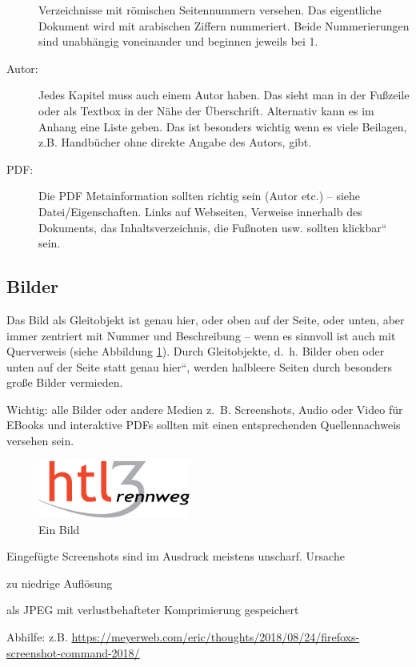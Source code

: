 \begin{description}
Verzeichnisse mit römischen Seitennummern versehen. Das eigentliche
Dokument wird mit arabischen Ziffern nummeriert. Beide Nummerierungen
sind unabhängig voneinander und beginnen jeweils bei 1.
\item [{Autor:}] Jedes Kapitel muss auch einem Autor haben. Das sieht man
in der Fußzeile oder als Textbox in der Nähe der Überschrift. Alternativ
kann es im Anhang eine Liste geben. Das ist besonders wichtig wenn
es viele Beilagen, z.B. Handbücher ohne direkte Angabe des Autors,
gibt.
\item [{PDF:}] Die PDF Metainformation sollten richtig sein (Autor etc.)
-- siehe Datei/Eigenschaften. Links auf Webseiten, Verweise innerhalb
des Dokuments, das Inhaltsverzeichnis, die Fußnoten usw. sollten \quotedblbase klickbar``
sein.
\end{description}

\subsection{Bilder\label{sub:Bilder}}

Das Bild als Gleitobjekt ist genau hier, oder oben auf der Seite,
oder unten, aber immer zentriert mit Nummer und Beschreibung -- wenn
es sinnvoll ist auch mit Querverweis (siehe Abbildung \ref{Bild11}).
Durch Gleitobjekte, d.~h. Bilder oben oder unten auf der Seite statt
\quotedblbase genau hier``, werden halbleere Seiten durch besonders
große Bilder vermieden.

Wichtig: alle Bilder oder andere Medien z.~B. Screenshots, Audio
oder Video für EBooks und interaktive PDFs sollten mit einen entsprechenden
Quellennachweis versehen sein.

\begin{figure}[tbh]
\begin{centering}
\includegraphics[width=5cm]{HTL3RLogoRGB}
\par\end{centering}

\caption{Ein Bild}
\label{Bild11}
\end{figure}

Eingefügte Screenshots sind im Ausdruck meistens unscharf. Ursache
\begin{liste}
\item zu niedrige Auflösung
\item als JPEG mit verlustbehafteter Komprimierung gespeichert
\end{liste}
Abhilfe: z.B. \url{https://meyerweb.com/eric/thoughts/2018/08/24/firefoxs-screenshot-command-2018/}

